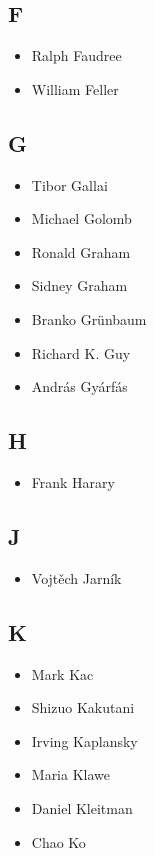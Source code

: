 \documentclass[12pt]{article}
\begin{document}
\subsection{F}
\begin{itemize}
\item Ralph Faudree
\item William Feller
\end{itemize}

\subsection{G}
\begin{itemize}
\item Tibor Gallai
\item Michael Golomb
\item Ronald Graham
\item Sidney Graham
\item Branko Gr\"unbaum
\item Richard K. Guy
\item Andr\'as Gy\'arf\'as
\end{itemize}

\subsection{H}
\begin{itemize}
\item Frank Harary
\end{itemize}

\subsection{J}
\begin{itemize}
\item Vojt\v{e}ch Jarn\'{i}k
\end{itemize}

\subsection{K}
\begin{itemize}
\item Mark Kac
\item Shizuo Kakutani
\item Irving Kaplansky
\item Maria Klawe
\item Daniel Kleitman 
\item Chao Ko
\end{itemize}
\end{document}

